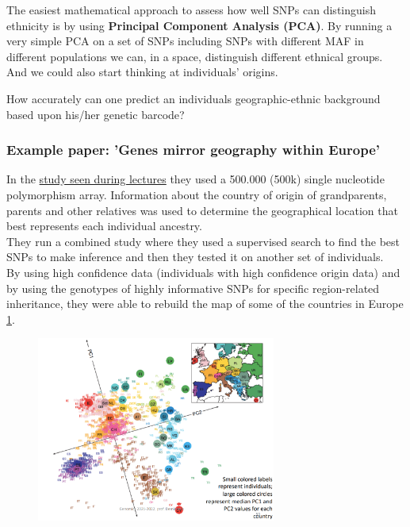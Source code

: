 The easiest mathematical approach to assess how well SNPs can distinguish ethnicity is by using \textbf{Principal Component Analysis (PCA)}. By running a very simple PCA on a set of SNPs including SNPs with different MAF in different populations we can, in a space, distinguish different ethnical groups. And we could also start thinking at individuals' origins.

How accurately can one predict an individuals geographic-ethnic background based upon his/her genetic barcode?

\subsubsection{Example paper: 'Genes mirror geography within Europe'}

In the \href{https://www.ncbi.nlm.nih.gov/pmc/articles/PMC2735096/}{study seen during lectures} they used a 500.000 (500k) single nucleotide polymorphism array. Information about the country of origin of grandparents, parents and other relatives was used to determine the geographical location that best represents each individual ancestry. \\
They run a combined study where they used a supervised search to find the best SNPs to make inference and then they tested it on another set of individuals. \\
By using high confidence data (individuals with high confidence origin data) and by using the genotypes of highly informative SNPs for specific region-related inheritance, they were able to rebuild the map of some of the countries in Europe \ref{fig:PCA_countries}.

\begin{figure}[H]
	\centering
	\includegraphics[width=0.7\textwidth]{population.PNG}
	\caption{\label{fig:PCA_countries}}
\end{figure}

